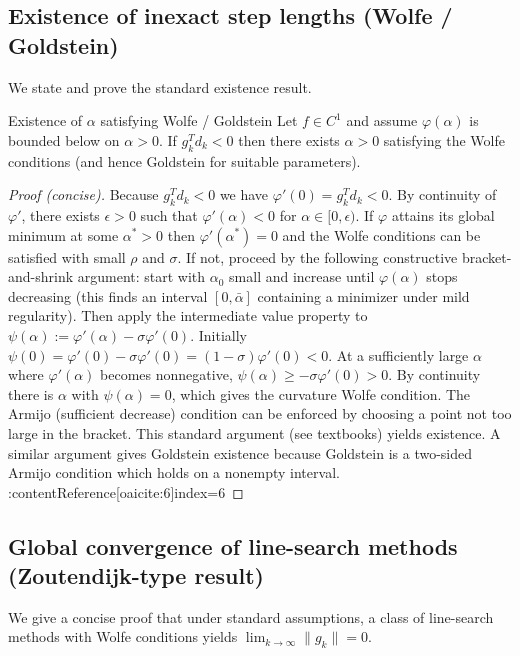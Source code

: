 \documentclass{MathNote}
\begin{document}
\subsection{Existence of inexact step lengths (Wolfe / Goldstein)}
We state and prove the standard existence result.

\begin{theorem}{Existence of \(\alpha\) satisfying Wolfe / Goldstein}{}
Let \(f\in C^1\) and assume \(\varphi(\alpha)\) is bounded below on \(\alpha>0\). If \(g_k^T d_k<0\) then there exists \(\alpha>0\) satisfying the Wolfe conditions (and hence Goldstein for suitable parameters).
\end{theorem}

\begin{proof}[Proof (concise)]
Because \(g_k^T d_k<0\) we have \(\varphi'(0)=g_k^T d_k<0\). By continuity of \(\varphi'\), there exists \(\epsilon>0\) such that \(\varphi'(\alpha)<0\) for \(\alpha\in[0,\epsilon)\). If \(\varphi\) attains its global minimum at some \(\alpha^*>0\) then \(\varphi'(\alpha^*)=0\) and the Wolfe conditions can be satisfied with small \(\rho\) and \(\sigma\). If not, proceed by the following constructive bracket-and-shrink argument: start with \(\alpha_0\) small and increase until \(\varphi(\alpha)\) stops decreasing (this finds an interval \([0,\bar\alpha]\) containing a minimizer under mild regularity). Then apply the intermediate value property to \(\psi(\alpha):=\varphi'(\alpha)-\sigma\varphi'(0)\). Initially \(\psi(0)=\varphi'(0)-\sigma\varphi'(0)=(1-\sigma)\varphi'(0)<0\). At a sufficiently large \(\alpha\) where \(\varphi'(\alpha)\) becomes nonnegative, \(\psi(\alpha)\ge -\sigma\varphi'(0)>0\). By continuity there is \(\alpha\) with \(\psi(\alpha)=0\), which gives the curvature Wolfe condition. The Armijo (sufficient decrease) condition can be enforced by choosing a point not too large in the bracket. This standard argument (see textbooks) yields existence. A similar argument gives Goldstein existence because Goldstein is a two-sided Armijo condition which holds on a nonempty interval. :contentReference[oaicite:6]{index=6}
\end{proof}

\subsection{Global convergence of line-search methods (Zoutendijk-type result)}
We give a concise proof that under standard assumptions, a class of line-search methods with Wolfe conditions yields \(\lim_{k\to\infty}\|g_k\|=0\).
\end{document}
